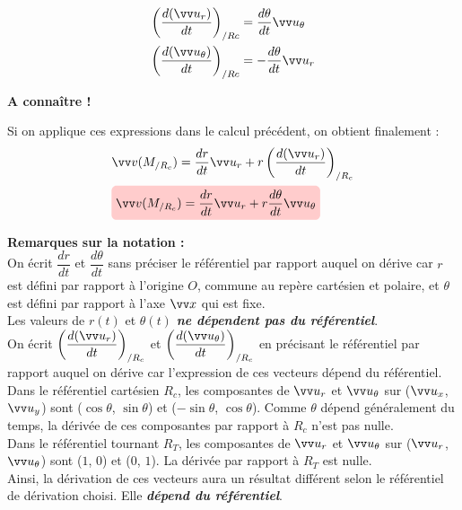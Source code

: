\documentclass[10.5pt,a4paper]{book}
\begin{document}
\begin{boite}
\begin{theoreme}


\begin{minipage}{.6\textwidth}    
    \begin{align*}
    \left(\frac{d(\vv u_r)}{dt}\right)_{/Rc} &= \frac{d\theta}{dt}\vv u_\theta\\
    \left(\frac{d(\vv u_\theta)}{dt}\right)_{/Rc} &= -\frac{d\theta}{dt}\vv u_r
\end{align*}
\end{minipage}
\hfill
\begin{minipage}{.38\textwidth} 
    \large{\textbf{A connaître !}}
\end{minipage}
\end{theoreme}

Si on applique ces expressions dans le calcul précédent, on obtient finalement : 
\begin{align*}
    &\vv v(M_{/R_c})=\frac{dr}{dt}\vv u_r + r\left(\frac{d(\vv u_r)}{dt}\right)_{/R_c}\\
    &\tikz[baseline]{
            \node[fill=red!20,anchor=base,rounded corners]
            {$\vv v(M_{/R_c})=\dfrac{dr}{dt}\vv u_r + r\dfrac{d\theta}{dt}\vv u_\theta$};
        } 
\end{align*}
\end{boite}
\vspace{5mm}
\textbf{Remarques sur la notation : }\\

On écrit $\dfrac{dr}{dt}$ et $\dfrac{d\theta}{dt}$ sans préciser le référentiel par rapport auquel on dérive car $r$ est défini par rapport à l'origine $O$, commune au repère cartésien et polaire, et $\theta$ est défini par rapport à l'axe $\vv x$ qui est fixe.\\

Les valeurs de $r(t)$ et $\theta(t)$ \emph{\textbf{ne dépendent pas du référentiel}}.\\

On écrit $\left(\dfrac{d(\vv u_r)}{dt}\right)_{/R_c}$ et $\left(\dfrac{d(\vv u_\theta)}{dt}\right)_{/R_c}$ en précisant le référentiel par rapport auquel on dérive car l'expression de ces vecteurs dépend du référentiel.\\

Dans le référentiel cartésien $R_c$, les composantes de $\vv u_r$ et $\vv u_\theta$ sur ($\vv u_x$, $\vv u_y$) sont ($\cos{\theta}$, $\sin{\theta}$) et ($-\sin{\theta}$, $\cos{\theta}$). Comme $\theta$ dépend généralement du temps, la dérivée de ces composantes par rapport à $R_c$ n'est pas nulle.\\
Dans le référentiel tournant $R_T$, les composantes de $\vv u_r$ et $\vv u_\theta$ sur ($\vv u_r$, $\vv u_\theta$) sont ($1$, $0$) et ($0$, $1$). La dérivée par rapport à $R_T$ est nulle.\\
Ainsi, la dérivation de ces vecteurs aura un résultat différent selon le référentiel de dérivation choisi. Elle \emph{\textbf{dépend du référentiel}}.\\
\end{document}
